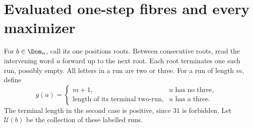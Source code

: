\section{Evaluated one-step fibres and every maximizer}
For $b\in\Dom_n$, call its one positions roots. Between consecutive
roots, read the intervening word $u$ forward up to the next root. Each
root terminates one such run, possibly empty. All letters in a run are
two or three. For a run of length $m$, define
\[
 g(u)=\begin{cases}
 m+1,&u\text{ has no three},\\
 \text{length of its terminal two-run},&u\text{ has a three}.
 \end{cases}
\]
The terminal length in the second case is positive, since $31$ is
forbidden. Let $\mathcal U(b)$ be the collection of these labelled runs.

